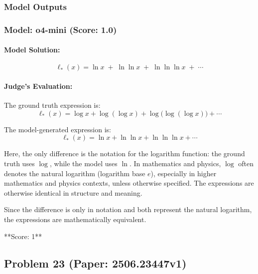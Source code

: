 \documentclass[10pt]{article}
\begin{document}
\subsubsection*{Model Outputs}
\subsubsection*{Model: o4-mini (Score: 1.0)}
\paragraph*{Model Solution:}
\[ \ell_*(x)
=\ln x \;+\;\ln\ln x\;+\;\ln\ln\ln x\;+\;\cdots \]

\paragraph*{Judge's Evaluation:}

The ground truth expression is:
\[
\ell_*(x) = \log x + \log(\log x) + \log\bigl(\log(\log x)\bigr) + \cdots
\]

The model-generated expression is:
\[
\ell_*(x) = \ln x + \ln \ln x + \ln \ln \ln x + \cdots
\]

Here, the only difference is the notation for the logarithm function: the ground truth uses $\log$, while the model uses $\ln$. In mathematics and physics, $\log$ often denotes the natural logarithm (logarithm base $e$), especially in higher mathematics and physics contexts, unless otherwise specified. The expressions are otherwise identical in structure and meaning.

Since the difference is only in notation and both represent the natural logarithm, the expressions are mathematically equivalent.

**Score: 1**

\newpage
\subsection*{Problem 23 (Paper: 2506.23447v1)}
\end{document}
